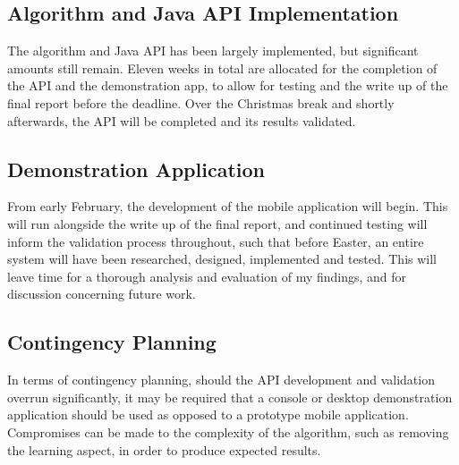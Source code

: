 \subsection{Algorithm and Java API Implementation}

The algorithm and Java API has been largely implemented, but significant amounts still remain. Eleven weeks in total are allocated for the completion of the API and the demonstration app, to allow for testing and the write up of the final report before the deadline. Over the Christmas break and shortly afterwards, the API will be completed and its results validated. 

\subsection{Demonstration Application}

From early February, the development of the mobile application will begin. This will run alongside the write up of the final report, and continued testing will inform the validation process throughout, such that before Easter, an entire system will have been researched, designed, implemented and tested. This will leave time for a thorough analysis and evaluation of my findings, and for discussion concerning future work. 

\subsection{Contingency Planning}

In terms of contingency planning, should the API development and validation overrun significantly, it may be required that a console or desktop demonstration application should be used as opposed to a prototype mobile application. Compromises can be made to the complexity of the algorithm, such as removing the learning aspect, in order to produce expected results. 

